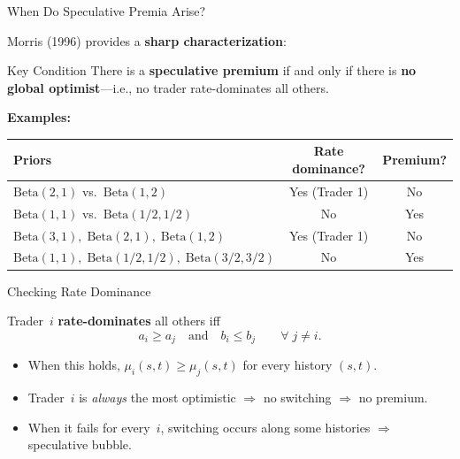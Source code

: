 \documentclass[11pt,aspectratio=169]{beamer}
\begin{document}
\begin{frame}{When Do Speculative Premia Arise?}

Morris (1996) provides a \textbf{sharp characterization}:

\bigskip

\begin{block}{Key Condition}
There is a \textbf{speculative premium} if and only if there is
\textbf{no global optimist}---i.e., no trader rate-dominates all others.
\end{block}

\bigskip

\textbf{Examples:}

\medskip
\begin{center}
\renewcommand{\arraystretch}{1.3}
\begin{tabular}{lcc}
\toprule
Priors & Rate dominance? & Premium? \\
\midrule
$\text{Beta}(2,1)$ vs.\ $\text{Beta}(1,2)$ & Yes (Trader 1) & No \\
$\text{Beta}(1,1)$ vs.\ $\text{Beta}(1/2,1/2)$ & No & Yes \\
$\text{Beta}(3,1),\;\text{Beta}(2,1),\;\text{Beta}(1,2)$ & Yes (Trader 1) & No \\
$\text{Beta}(1,1),\;\text{Beta}(1/2,1/2),\;\text{Beta}(3/2,3/2)$ & No & Yes \\
\bottomrule
\end{tabular}
\end{center}

\end{frame}

\begin{frame}{Checking Rate Dominance}

Trader~$i$ \textbf{rate-dominates} all others iff
\[
  a_i \ge a_j \quad\text{and}\quad b_i \le b_j
  \qquad\forall\; j \ne i.
\]

\medskip

\begin{itemize}
\item When this holds, $\mu_i(s,t)\ge\mu_j(s,t)$ for every
      history $(s,t)$.
\item Trader~$i$ is \emph{always} the most optimistic
      $\Rightarrow$ no switching $\Rightarrow$ no premium.
\item When it fails for every~$i$, switching occurs along some
      histories $\Rightarrow$ speculative bubble.
\end{itemize}

\end{frame}
\end{document}
